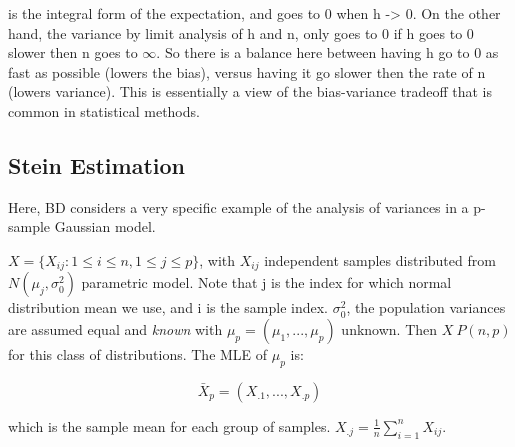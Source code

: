 		is the integral form of the expectation, and goes to 0 when h -> 0. On the other hand, the variance by limit analysis of h and n, only goes to 0 if h goes to 0 slower then n goes to $\infty$. So there is a balance here between having h go to 0 as fast as possible (lowers the bias), versus having it go slower then the rate of n (lowers variance). This is essentially a view of the bias-variance tradeoff that is common in statistical methods.

	\subsection{Stein Estimation}

		Here, BD considers a very specific example of the analysis of variances in a p-sample Gaussian model.

		$X = \{X_{ij} : 1 \le i \le n, 1 \le j \le p\}$, with $X_{ij}$ independent samples distributed from $N(\mu_j, \sigma_0^2)$ parametric model. Note that j is the index for which normal distribution mean we use, and i is the sample index. $\sigma_0^2$, the population variances are assumed equal and \textit{known} with $\mu_p = (\mu_1, ..., \mu_p)$ unknown. Then $X ~ P(n,p)$ for this class of distributions. The MLE of $\mu_p$ is:

			$$\bar{X}_p = (X_{.1}, ..., X_{.p})$$

		which is the sample mean for each group of samples. $X_{.j} = \frac{1}{n} \sum_{i=1}^n X_{ij}$. 

	